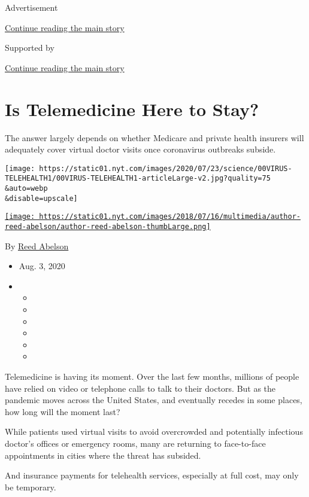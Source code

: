 Advertisement

\protect\hyperlink{after-top}{Continue reading the main story}

Supported by

\protect\hyperlink{after-sponsor}{Continue reading the main story}

\hypertarget{is-telemedicine-here-to-stay}{%
\section{Is Telemedicine Here to
Stay?}\label{is-telemedicine-here-to-stay}}

The answer largely depends on whether Medicare and private health
insurers will adequately cover virtual doctor visits once coronavirus
outbreaks subside.

\texttt{[image: https://static01.nyt.com/images/2020/07/23/science/00VIRUS-TELEHEALTH1/00VIRUS-TELEHEALTH1-articleLarge-v2.jpg?quality=75\\\&auto=webp\\\&disable=upscale]}

\href{https://www.nytimes.com/by/reed-abelson}{\texttt{[image: https://static01.nyt.com/images/2018/07/16/multimedia/author-reed-abelson/author-reed-abelson-thumbLarge.png]}}

By \href{https://www.nytimes.com/by/reed-abelson}{Reed Abelson}

\begin{itemize}
\item
  Aug. 3, 2020
\item
  \begin{itemize}
  \item
  \item
  \item
  \item
  \item
  \item
  \end{itemize}
\end{itemize}

Telemedicine is having its moment. Over the last few months, millions of
people have relied on video or telephone calls to talk to their doctors.
But as the pandemic moves across the United States, and eventually
recedes in some places, how long will the moment last?

While patients used virtual visits to avoid overcrowded and potentially
infectious doctor's offices or emergency rooms, many are returning to
face-to-face appointments in cities where the threat has subsided.

And insurance payments for telehealth services, especially at full cost,
may only be temporary.

